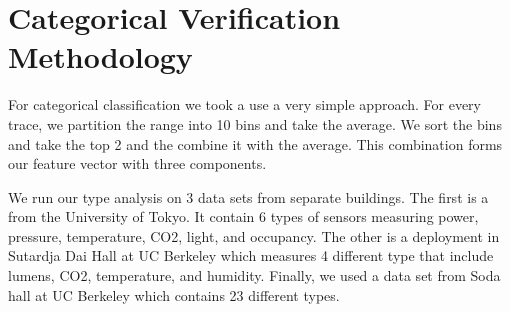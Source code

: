 \section{Categorical Verification Methodology}
For categorical classification we took a use a very simple approach.  For every trace, we partition the range into 10 bins
and take the average.  We sort the bins and take the top 2 and the combine it with the average.  This combination forms
our feature vector with three components.

We run our type analysis on 3 data sets from separate buildings.  The first is a from the University of Tokyo.  It contain 
6 types of sensors measuring power, pressure, temperature, CO2, light, and occupancy.
The other is a deployment in Sutardja Dai Hall at UC Berkeley which measures 4 different type that include lumens, CO2, 
temperature, and humidity.
Finally, we used a data set from Soda hall at UC Berkeley which contains 23 different types.
